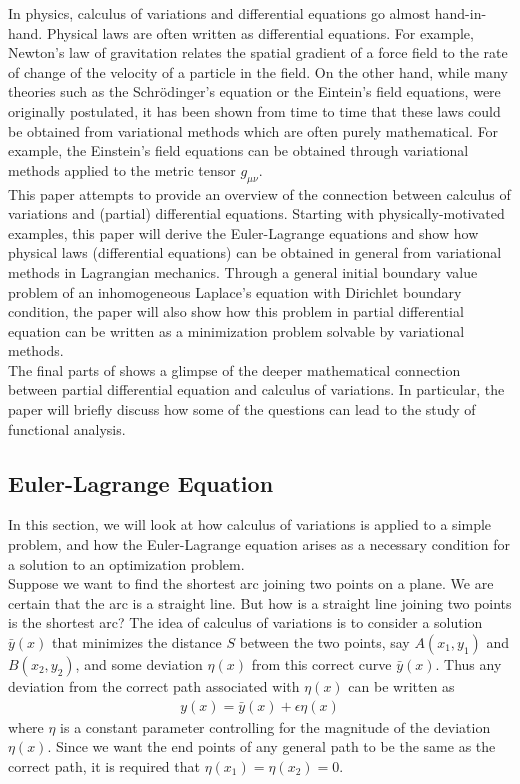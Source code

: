 \documentclass{article}
\begin{document}
In physics, calculus of variations and differential equations go almost hand-in-hand. Physical laws are often written as differential equations. For example, Newton's law of gravitation relates the spatial gradient of a force field to the rate of change of the velocity of a particle in the field. On the other hand, while many theories such as the Schr\"{o}dinger's equation or the Eintein's field equations, were originally postulated, it has been shown from time to time that these laws could be obtained from variational methods which are often purely mathematical. For example, the Einstein's field equations can be obtained through variational methods applied to the metric tensor $g_{\mu\nu}$. \\


This paper attempts to provide an overview of the connection between calculus of variations and (partial) differential equations. Starting with physically-motivated examples, this paper will derive the Euler-Lagrange equations and show how physical laws (differential equations) can be obtained in general from variational methods in Lagrangian mechanics. Through a general initial boundary value problem of an inhomogeneous Laplace's equation with Dirichlet boundary condition, the paper will also show how this problem in partial differential equation can be written as a minimization problem solvable by variational methods. \\

The final parts of shows a glimpse of the deeper mathematical connection between partial differential equation and calculus of variations. In particular, the paper will briefly discuss how some of the questions can lead to the study of functional analysis.  


\subsection{Euler-Lagrange Equation}

In this section, we will look at how calculus of variations is applied to a simple problem, and how the Euler-Lagrange equation arises as a necessary condition for a solution to an optimization problem. \\

Suppose we want to find the shortest arc joining two points on a plane. We are certain that the arc is a straight line. But how is a straight line joining two points is the shortest arc? The idea of calculus of variations is to consider a solution $\bar{y}(x)$ that minimizes the distance $S$ between the two points, say $A(x_1,y_1)$ and $B(x_2,y_2)$, and some deviation $\eta(x)$ from this correct curve $\bar{y}(x)$. Thus any deviation from the correct path associated with $\eta(x)$ can be written as
\begin{align}
y(x) = \bar{y}(x) + \epsilon \eta(x)
\end{align}
where $\eta$ is a constant parameter controlling for the magnitude of the deviation $\eta(x)$. Since we want the end points of any general path to be the same as the correct path, it is required that $\eta(x_1) = \eta(x_2) = 0$.\\
\end{document}
